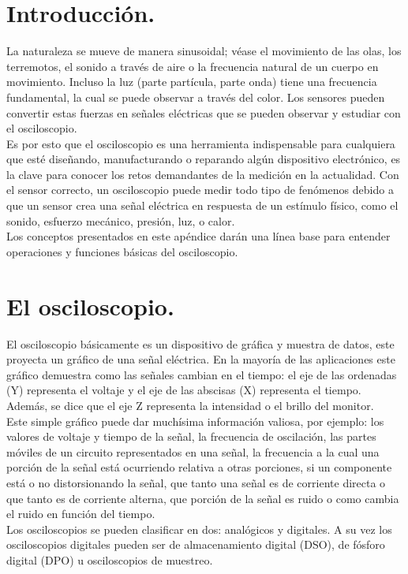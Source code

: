 \documentclass[12pt,letterpaper]{report}
\begin{document}
\section{Introducción.} La naturaleza se mueve de manera sinusoidal; véase el movimiento de las olas, los terremotos, el sonido a través de aire o la frecuencia natural de un cuerpo en movimiento. Incluso la luz (parte partícula, parte onda) tiene una frecuencia fundamental, la cual se puede observar a través del color. Los sensores pueden convertir estas fuerzas en señales eléctricas que se pueden observar y estudiar con el osciloscopio.\\
Es por esto que el osciloscopio es una herramienta indispensable para cualquiera que esté diseñando, manufacturando o reparando algún dispositivo electrónico, es la clave para conocer los retos demandantes de la medición en la actualidad. Con el sensor correcto, un osciloscopio puede medir todo tipo de fenómenos debido a que un sensor crea una señal eléctrica en respuesta de un estímulo físico, como el sonido, esfuerzo mecánico, presión, luz, o calor.\\
Los conceptos presentados en este apéndice darán una línea base para entender operaciones y funciones básicas del osciloscopio.
\section{El osciloscopio.} El osciloscopio básicamente es un dispositivo de gráfica y muestra de datos, este proyecta un gráfico de una señal eléctrica. En la mayoría de las aplicaciones este gráfico demuestra como las señales cambian en el tiempo: el eje de las ordenadas (Y) representa el voltaje y el eje de las abscisas (X) representa el tiempo. Además, se dice que el eje Z representa la intensidad o el brillo del monitor.\\
Este simple gráfico puede dar muchísima información valiosa, por ejemplo: los valores de voltaje y tiempo de la señal, la frecuencia de oscilación, las partes móviles de un circuito representados en una señal, la frecuencia a la cual una porción de la señal está ocurriendo relativa a otras porciones, si un componente está o no distorsionando la señal, que tanto una señal es de corriente directa o que tanto es de corriente alterna, que porción de la señal es ruido o como cambia el ruido en función del tiempo.\\
Los osciloscopios se pueden clasificar en dos: analógicos y digitales. A su vez los osciloscopios digitales pueden ser de almacenamiento digital (DSO), de fósforo digital (DPO) u osciloscopios de muestreo.
\end{document}
